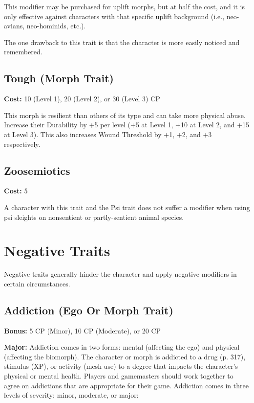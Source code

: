 This modifier may be purchased for uplift morphs, but at half the cost, and it is only effective against characters with that specific uplift background (i.e., neo-avians, neo-hominids, etc.).

The one drawback to this trait is that the character is more easily noticed and remembered.

\subsection{Tough (Morph Trait)} 
\label{sec:traits-tough}

\textbf{Cost:} 10 (Level 1), 20 (Level 2), or 30 (Level 3) CP

This morph is resilient than others of its type and can take more physical abuse. Increase their Durability by +5 per level (+5 at Level 1, +10 at Level 2, and +15 at Level 3). This also increases Wound Threshold by +1, +2, and +3 respectively.

\subsection{Zoosemiotics}
\label{sec:traits-zoosemiotics}

\textbf{Cost:} 5

A character with this trait and the Psi trait does not suffer a modifier when using psi sleights on nonsentient or partly-sentient animal species.

\section{Negative Traits}
\label{sec:negative-traits}

Negative traits generally hinder the character and apply negative modifiers in certain circumstances.

\subsection{Addiction (Ego Or Morph Trait)}
\label{sec:traits-addiction}

\textbf{Bonus:} 5 CP (Minor), 10 CP (Moderate), or 20 CP

\textbf{Major:} Addiction comes in two forms: mental (affecting the ego) and physical (affecting the biomorph). The character or morph is addicted to a drug (p. 317), stimulus (XP), or activity (mesh use) to a degree that impacts the character’s physical or mental health. Players and gamemasters should work together to agree on addictions that are appropriate for their game. Addiction comes in three levels of severity: minor, moderate, or major:

